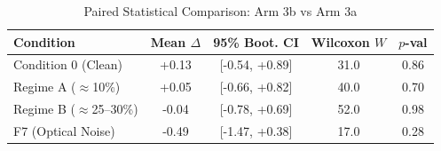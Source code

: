 \begin{table}[t]
\caption{Paired Statistical Comparison: Arm 3b vs Arm 3a}
\label{tab:paired_comparison}
\centering
\scriptsize
\setlength{\tabcolsep}{2.5pt}
\begin{tabular}{|l|c|c|c|c|}
\hline
\textbf{Condition} & \textbf{Mean $\Delta$} & \textbf{95\% Boot. CI} & \textbf{Wilcoxon $W$} & \textbf{$p$-val} \\
\hline
Condition 0 (Clean)    & +0.13 & [-0.54, +0.89] &  31.0 & 0.86 \\
Regime A ($\approx$10\%) & +0.05 & [-0.66, +0.82] &  40.0 & 0.70 \\
Regime B ($\approx$25--30\%) & -0.04 & [-0.78, +0.69] &  52.0 & 0.98 \\
F7 (Optical Noise)     & -0.49 & [-1.47, +0.38] &  17.0 & 0.28 \\
\hline
\end{tabular}
\end{table}
